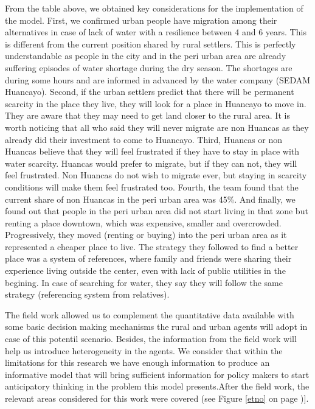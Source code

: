 \documentclass{article}
\begin{document}
From the table above, we obtained key considerations for the implementation of the model. First, we confirmed urban people have migration among their alternatives in case of lack of water with a resilience between 4 and 6 years. This is different from the current position shared by rural settlers. This is perfectly understandable as people in the city and in the peri urban area are already suffering episodes of water shortage during the dry season. The shortages are during some hours and are informed in advanced by the water company (SEDAM Huancayo).  Second, if the urban settlers predict that there will be permanent scarcity in the place they live, they will look for a place in Huancayo to move in. They are aware that they may need to get land closer to the rural area. It is worth noticing that all who said they will never migrate are non Huancas as they already did their investment to come to Huancayo. Third,   Huancas or non Huancas  believe that they will feel frustrated if they have to stay in place with water scarcity. Huancas would prefer to migrate, but if they can not, they will feel frustrated. Non Huancas do not wish to migrate ever, but staying in scarcity conditions will make them feel frustrated too. Fourth, the team found that the current share of non Huancas in the peri urban area was 45\%. And finally, we found out that people in the peri urban area did not start living in that zone but renting a place downtown, which was expensive, smaller and overcrowded. Progressively, they moved (renting or buying) into the peri urban area as it represented a cheaper place to live. The strategy they followed to find a better place was a system of references, where family and friends were sharing their experience living outside the center, even with lack of public utilities in the begining. In case of searching for water, they say they will follow the same strategy (referencing system from relatives).

The field work allowed us to complement the quantitative data available with some basic decision making mechanisms the rural and urban agents will adopt in case of this potentil scenario. Besides, the information from the field work will help us introduce heterogeneity in the agents. We consider that within the limitations for this research we have enough information to produce an informative model that will bring sufficient information for policy makers to start anticipatory thinking in the problem this model presents.After the field work, the relevant areas considered for this work were covered (see Figure \ref{etno} on page \pageref{etno})]. 
\end{document}
